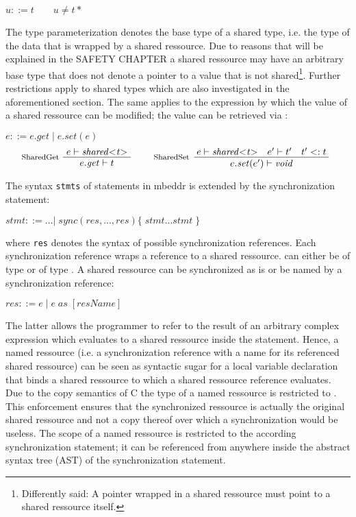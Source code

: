 $ u ::= t \qquad u \neq t*$

The type parameterization denotes the base type of a shared type, i.e. the type of the data that is wrapped by a shared ressource. Due to reasons that will be explained in the SAFETY CHAPTER a shared ressource may have an arbitrary base type that does not denote a pointer to a value that is not shared\footnote{Differently said: A pointer wrapped in a shared ressource must point to a shared ressource itself.}. Further restrictions apply to shared types which are also investigated in the aforementioned section. The same applies to the  expression by which the value of a shared ressource can be modified; the value can be retrieved via :

$ e ::= e.\mathit{get}\;|\;e.\mathit{set(e)} $
\begin{align*}
\inference*[SharedGet]{e |- \mathit{shared{<}t{>}}} {\quad e.\mathit{get} |- t \quad}
\qquad
\inference*[SharedSet]{e |- \mathit{shared{<}t{>}} \quad e' |- t' \quad t' <: t} {\qquad\quad e.\mathit{set}(e') |- \mathit{void} \quad\qquad} 
\end{align*}

The syntax \texttt{stmts} of statements in mbeddr is extended by the synchronization statement:

$ \mathit{stmt} ::= ...
        |\;\mathit{sync}(res, ..., res) \{\;\mathit{stmt} ... \mathit{stmt}\;\}$
        
where \texttt{res} denotes the syntax of possible synchronization references. Each synchronization reference  wraps a reference  to a shared ressource.  can either be of type  or of type . A shared ressource can be synchronized as is or be named by a synchronization reference:

$ res ::= e\;|\;e\;\mathit{as}\;[\mathit{resName}] $

The latter allows the programmer to refer to the result of an arbitrary complex expression which evaluates to a shared ressource inside the  statement. Hence, a named ressource (i.e. a synchronization reference with a name for its referenced shared ressource) can be seen as syntactic sugar for a local variable declaration that binds a shared ressource to which a shared ressource reference evaluates. Due to the copy semantics of C the type of a named ressource  is restricted to . This enforcement ensures that the synchronized ressource is actually the original shared ressource and not a copy thereof over which a synchronization would be useless. The scope of a named ressource is restricted to the according synchronization statement; it can be referenced from anywhere inside the abstract syntax tree (AST) of the synchronization statement.

